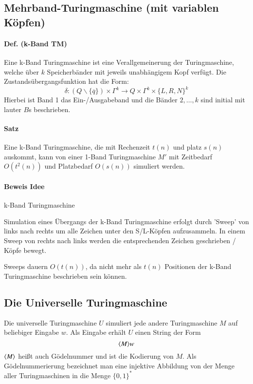 \subsection{Mehrband-Turingmaschine (mit variablen Köpfen)}

\paragraph*{Def. (k-Band TM)} Eine k-Band Turingmaschine ist eine Verallgemeinerung der Turingmaschine, welche über $k$ Speicherbänder mit jeweils unabhängigem Kopf verfügt. Die Zustandsübergangsfunktion hat die Form: $$ \delta : (Q\backslash\{\overline{q}\}) \times \Gamma^k \rightarrow Q \times \Gamma^k \times \{L,R,N\}^k $$ Hierbei ist Band 1 das Ein-/Ausgabeband und die Bänder $2,\dots,k$ sind initial mit lauter $B$s beschrieben.

\paragraph*{Satz} Eine k-Band Turingmaschine, die mit Rechenzeit $t(n)$ und platz $s(n)$ auskommt, kann von einer 1-Band Turingmaschine $M'$ mit Zeitbedarf $O(t^2(n))$ und Platzbedarf $O(s(n))$ simuliert werden.

\paragraph*{Beweis Idee} k-Band Turingmaschine %

Simulation eines Übergangs der k-Band Turingmaschine erfolgt durch 'Sweep' von links nach rechts um alle Zeichen unter den S/L-Köpfen aufzusammeln. In einem Sweep von rechts nach links werden die entsprechenden Zeichen geschrieben / Köpfe bewegt.

\par\medskip
Sweeps dauern $O(t(n))$, da nicht mehr als $t(n)$ Positionen der k-Band Turingmaschine beschrieben sein können.\par\medskip

\subsection{Die Universelle Turingmaschine}
Die universelle Turingmaschine $U$ simuliert jede andere Turingmaschine $M$ auf beliebiger Eingabe $w$. Als Eingabe erhält $U$ einen String der Form $$\langle M \rangle w$$ $\langle M \rangle$ heißt auch Gödelnummer und ist die Kodierung von $M$. Als Gödelnummerierung bezeichnet man eine injektive Abbildung von der Menge aller Turingmaschinen in die Menge $\{0,1\}^*$

